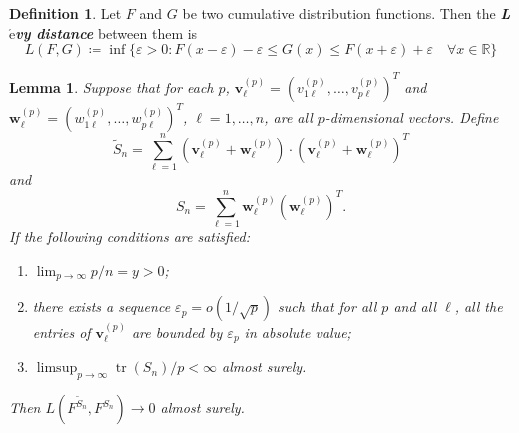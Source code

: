 \documentclass[a4paper,11pt]{book}
\theoremstyle{plain}
\newtheorem{lmm}[thm]{Lemma}
\theoremstyle{definition}
\newtheorem{defn}[thm]{Definition}
\newcommand{\MR}{\mathbb{R}}
\newcommand{\tr}{\operatorname{tr}}
\newcommand{\define}[1]{\textit{\textbf{#1}}}
\begin{document}
    \begin{defn}
    	Let $F$ and $G$ be two cumulative distribution functions. Then the \define{L$\acute{\text{e}}$vy distance} between them is
    	\[ L(F, G) \coloneqq \inf \{ \varepsilon > 0 : F(x-\varepsilon) -\varepsilon \leq G(x) \leq F(x+\varepsilon) + \varepsilon \quad \forall x\in\MR   \} \]
    \end{defn}
    
    \begin{lmm} \label{lmm1}
    	Suppose that for each $p$, $\mathbf{v}_\ell^{(p)} = (v_{1\ell}^{(p)}, \dots, v_{p\ell}^{(p)})^T$ and $\mathbf{w}_\ell^{(p)} = (w_{1\ell}^{(p)}, \dots, w_{p\ell}^{(p)})^T$, $\ell = 1, \dots, n$, are all $p$-dimensional vectors. Define
    	\[	\widetilde{S}_n = \sum_{\ell = 1}^{n} (\mathbf{v}_\ell^{(p)} + \mathbf{w}_\ell^{(p)}) \cdot (\mathbf{v}_\ell^{(p)} + \mathbf{w}_\ell^{(p)})^T\]
    	and
    	\[S_n = \sum_{\ell = 1}^{n} \mathbf{w}_\ell^{(p)} (\mathbf{w}_\ell^{(p)})^T. \]
    	If the following conditions are satisfied:
    	\begin{enumerate}
    		\item $\lim_{p \rightarrow \infty} p/n = y > 0$;
    		\item there exists a sequence $\varepsilon_p = o(1/\sqrt{p})$ such that for all $p$ and all $\ell$, all the entries of $\mathbf{v}_\ell^{(p)}$ are bounded by $\varepsilon_p$ in absolute value;
    		\item $ \limsup_{p \rightarrow \infty} {\tr(S_n)}/{p} < \infty$ almost surely.
    	\end{enumerate}
    	Then $L(F^{\widetilde{S}_n}, F^{S_n}) \rightarrow 0$ almost surely.
    \end{lmm}
\end{document}
